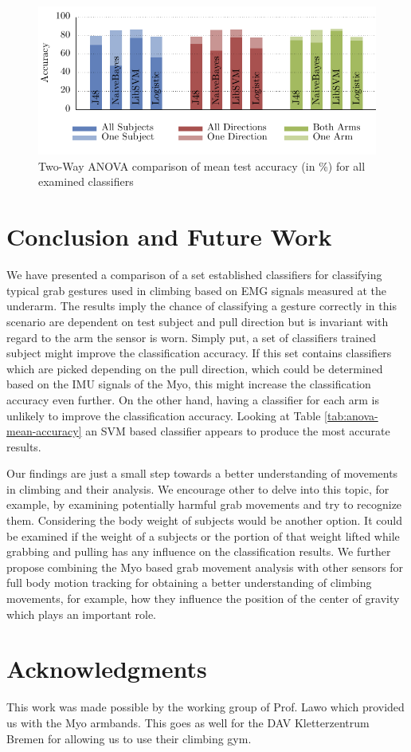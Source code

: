 \documentclass[journal]{IEEEtran}
\begin{document}
\begin{figure}
\centering
\includegraphics[width=\linewidth]{img/avg-accuracy-test-wrapped.pdf}
\caption{Two-Way ANOVA comparison of mean test accuracy (in \%) for all examined classifiers}
\label{fig:anova-mean-test}
\end{figure}

\section{Conclusion and Future Work}

We have presented a comparison of a set established classifiers for classifying typical grab gestures used in climbing based on EMG signals measured at the underarm. The results imply the chance of classifying a gesture correctly in this scenario are dependent on test subject and pull direction but is invariant with regard to the arm the sensor is worn. Simply put, a set of classifiers trained subject might improve the classification accuracy. If this set contains classifiers which are picked depending on the pull direction, which could be determined based on the IMU signals of the Myo, this might increase the classification accuracy even further. On the other hand, having a classifier for each arm is unlikely to improve the classification accuracy. Looking at Table \ref{tab:anova-mean-accuracy} an SVM based classifier appears to produce the most accurate results.

Our findings are just a small step towards a better understanding of movements in climbing and their analysis. We encourage other to delve into this topic, for example, by examining potentially harmful grab movements and try to recognize them. Considering the body weight of subjects would be another option. It could be examined if the weight of a subjects or the portion of that weight lifted while grabbing and pulling has any influence on the classification results. We further propose combining the Myo based grab movement analysis with other sensors for full body motion tracking for obtaining a better understanding of climbing movements, for example, how they influence the position of the center of gravity which plays an important role.

\section{Acknowledgments}

This work was made possible by the working group of Prof. Lawo which provided us with the Myo armbands. This goes as well for the DAV Kletterzentrum Bremen for allowing us to use their climbing gym.

\appendices

\printbibliography
\end{document}

